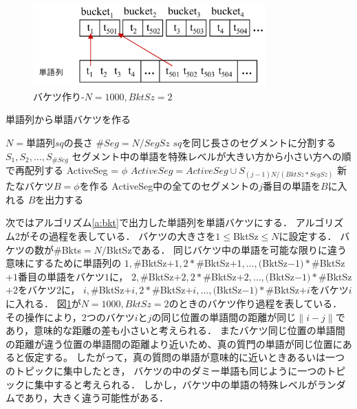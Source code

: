 \documentclass[master]{suribt}
\theoremstyle{definition}
\begin{document}
 \begin{figure}[!hbp]
  \centering
  \includegraphics[width=0.8\textwidth,natwidth=5677,natheight=1982]{rk11.png}
  \caption{バケツ作り-$N=1000,BktSz=2$}\label{fig:bkt}
 \end{figure}

 \begin{algorithm}
 \caption{単語列から単語バケツを作る}
 \begin{algorithmic}[1]
  \State $N=$単語列$sq$の長さ
  \State $\#Seg=N/SegSz$
  \State $sq$を同じ長さのセグメントに分割する$S_1,S_2, \dots , S_{\#Seg}$
  \State セグメント中の単語を特殊レベルが大きい方から小さい方への順で再配列する
   \State ActiveSeg = $\phi$
    \State $ActiveSeg = ActiveSeg \cup S_{(j-1)N/(BktSz * SegSz)}$
   \EndFor
    \State 新たなバケツ$B=\phi$を作る
    \State ActiveSeg中の全てのセグメントの$j$番目の単語を$B$に入れる
    \State $B$を出力する
   \EndFor
  \EndFor
 \EndFunction
 \end{algorithmic}
 \label{a:bkt2}
 \end{algorithm}
 
 次ではアルゴリズム\ref{a:bkt}で出力した単語列を単語バケツにする．
 アルゴリズム2がその過程を表している．
 バケツの大きさを$1 \leq$BktSz$\leq N$に設定する．
 バケツの数が\#Bkts$=N/$BktSzである．
 同じバケツ中の単語を可能な限りに違う意味にするために単語列の
 $1,\#$BktSz$+1,2*\#$BktSz$+1, \dots,($BktSz$-1)*\#$BktSz$+1$番目の単語をバケツ$1$に，
 $2,\#$BktSz$+2,2*\#$BktSz$+2, \dots,($BktSz$-1)*\#$BktSz$+2$をバケツ$2$に，
 $i,\#$BktSz$+i,2*\#$BktSz$+i, \dots,($BktSz$-1)*\#$BktSz$+i$をバケツ$i$に入れる．
 図\ref{fig:bkt}が$N=1000,BktSz=2$のときのバケツ作り過程を表している．
 その操作により，2つのバケツ$i$と$j$の同じ位置の単語間の距離が同じ$\|i-j\|$であり，意味的な距離の差も小さいと考えられる．
 またバケツ同じ位置の単語間の距離が違う位置の単語間の距離より近いため、真の質門の単語が同じ位置にあると仮定する。
 したがって，真の質問の単語が意味的に近いときあるいは一つのトピックに集中したとき，
 バケツの中のダミー単語も同じように一つのトピックに集中すると考えられる．
 しかし，バケツ中の単語の特殊レベルがランダムであり，大きく違う可能性がある．
\end{document}
